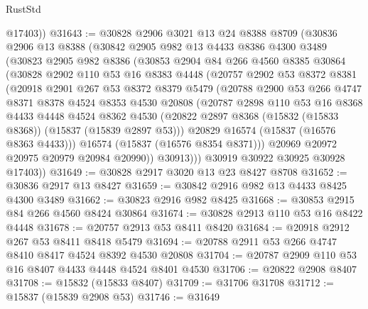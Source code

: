 \begin{lexlean}{RustStd}
\begin{coremodule}
        @17403))
@31643 := @30828
    @2906
    @3021
    @13
    @24
    @8388
    @8709
    (@30836
      @2906
      @13
      @8388
      (@30842
        @2905
        @982
        @13
        @4433
        @8386
        @4300
        @3489
        (@30823
          @2905
          @982
          @8386
          (@30853
            @2904
            @84
            @266
            @4560
            @8385
            @30864
            (@30828
              @2902
              @110
              @53
              @16
              @8383
              @4448
              (@20757
                @2902
                @53
                @8372
                @8381
                (@20918
                  @2901
                  @267
                  @53
                  @8372
                  @8379
                  @5479
                  (@20788
                    @2900
                    @53
                    @266
                    @4747
                    @8371
                    @8378
                    @4524
                    @8353
                    @4530
                    @20808
                    (@20787
                      @2898
                      @110
                      @53
                      @16
                      @8368
                      @4433
                      @4448
                      @4524
                      @8362
                      @4530
                      (@20822 @2897 @8368 (@15832 (@15833 @8368)) (@15837 (@15839 @2897 @53)))
                      @20829
                      @16574
                      (@15837 (@16576 @8363 @4433)))
                    @16574
                    (@15837 (@16576 @8354 @8371)))
                  @20969
                  @20972
                  @20975
                  @20979
                  @20984
                  @20990))
              @30913)))
        @30919
        @30922
        @30925
        @30928
        @17403))
@31649 := @30828 @2917 @3020 @13 @23 @8427 @8708
@31652 := @30836 @2917 @13 @8427
@31659 := @30842 @2916 @982 @13 @4433 @8425 @4300 @3489
@31662 := @30823 @2916 @982 @8425
@31668 := @30853 @2915 @84 @266 @4560 @8424 @30864
@31674 := @30828 @2913 @110 @53 @16 @8422 @4448
@31678 := @20757 @2913 @53 @8411 @8420
@31684 := @20918 @2912 @267 @53 @8411 @8418 @5479
@31694 := @20788 @2911 @53 @266 @4747 @8410 @8417 @4524 @8392 @4530 @20808
@31704 := @20787 @2909 @110 @53 @16 @8407 @4433 @4448 @4524 @8401 @4530
@31706 := @20822 @2908 @8407
@31708 := @15832 (@15833 @8407)
@31709 := @31706 @31708
@31712 := @15837 (@15839 @2908 @53)
@31746 := @31649

\end{coremodule}
\end{lexlean}
